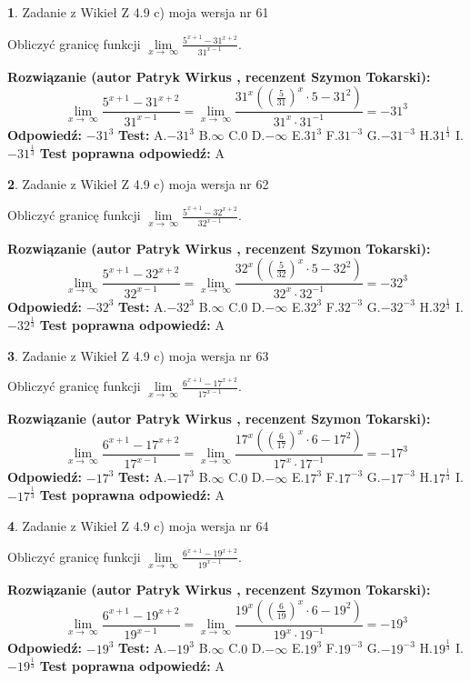 \documentclass[12pt, a4paper]{article}
\theoremstyle{definition} %
\newtheorem{zad}{}
\newcommand{\zadStart}[1]{\begin{zad}#1\newline}
\newcommand{\zadStop}{\end{zad}}
\newcommand{\rozwStart}[2]{\noindent \textbf{Rozwiązanie (autor #1 , recenzent #2): }\newline}
\newcommand{\rozwStop}{\newline}
\newcommand{\odpStart}{\noindent \textbf{Odpowiedź:}\newline}
\newcommand{\odpStop}{\newline}
\newcommand{\testStart}{\noindent \textbf{Test:}\newline}
\newcommand{\testStop}{\newline}
\newcommand{\kluczStart}{\noindent \textbf{Test poprawna odpowiedź:}\newline}
\newcommand{\kluczStop}{\newline}
\begin{document}
\zadStart{Zadanie z Wikieł Z 4.9 c) moja wersja nr 61}


Obliczyć granicę funkcji  $\lim\limits_{x\to\ \infty}\frac{5^{x+1}-31^{x+2}}{31^{x-1}}$.
\zadStop
\rozwStart{Patryk Wirkus}{Szymon Tokarski}
$$\lim\limits_{x\to\ \infty}\frac{5^{x+1}-31^{x+2}}{31^{x-1}}=\lim\limits_{x\to\ \infty}\frac{31^{x}((\frac{5}{31})^{x}\cdot 5 -31^{2})}{31^{x}\cdot 31^{-1}} = -31^{3}$$
\rozwStop
\odpStart
$-31^{3}$
\odpStop
\testStart
A.$-31^{3}$ B.$\infty$ C.$0$ D.$-\infty$ E.$31^{3}$
F.$31^{-3}$ G.$-31^{-3}$
H.$31^{\frac{1}{3}}$
I.$-31^{\frac{1}{3}}$
\testStop
\kluczStart
A
\kluczStop



\zadStart{Zadanie z Wikieł Z 4.9 c) moja wersja nr 62}


Obliczyć granicę funkcji  $\lim\limits_{x\to\ \infty}\frac{5^{x+1}-32^{x+2}}{32^{x-1}}$.
\zadStop
\rozwStart{Patryk Wirkus}{Szymon Tokarski}
$$\lim\limits_{x\to\ \infty}\frac{5^{x+1}-32^{x+2}}{32^{x-1}}=\lim\limits_{x\to\ \infty}\frac{32^{x}((\frac{5}{32})^{x}\cdot 5 -32^{2})}{32^{x}\cdot 32^{-1}} = -32^{3}$$
\rozwStop
\odpStart
$-32^{3}$
\odpStop
\testStart
A.$-32^{3}$ B.$\infty$ C.$0$ D.$-\infty$ E.$32^{3}$
F.$32^{-3}$ G.$-32^{-3}$
H.$32^{\frac{1}{3}}$
I.$-32^{\frac{1}{3}}$
\testStop
\kluczStart
A
\kluczStop



\zadStart{Zadanie z Wikieł Z 4.9 c) moja wersja nr 63}


Obliczyć granicę funkcji  $\lim\limits_{x\to\ \infty}\frac{6^{x+1}-17^{x+2}}{17^{x-1}}$.
\zadStop
\rozwStart{Patryk Wirkus}{Szymon Tokarski}
$$\lim\limits_{x\to\ \infty}\frac{6^{x+1}-17^{x+2}}{17^{x-1}}=\lim\limits_{x\to\ \infty}\frac{17^{x}((\frac{6}{17})^{x}\cdot 6 -17^{2})}{17^{x}\cdot 17^{-1}} = -17^{3}$$
\rozwStop
\odpStart
$-17^{3}$
\odpStop
\testStart
A.$-17^{3}$ B.$\infty$ C.$0$ D.$-\infty$ E.$17^{3}$
F.$17^{-3}$ G.$-17^{-3}$
H.$17^{\frac{1}{3}}$
I.$-17^{\frac{1}{3}}$
\testStop
\kluczStart
A
\kluczStop



\zadStart{Zadanie z Wikieł Z 4.9 c) moja wersja nr 64}


Obliczyć granicę funkcji  $\lim\limits_{x\to\ \infty}\frac{6^{x+1}-19^{x+2}}{19^{x-1}}$.
\zadStop
\rozwStart{Patryk Wirkus}{Szymon Tokarski}
$$\lim\limits_{x\to\ \infty}\frac{6^{x+1}-19^{x+2}}{19^{x-1}}=\lim\limits_{x\to\ \infty}\frac{19^{x}((\frac{6}{19})^{x}\cdot 6 -19^{2})}{19^{x}\cdot 19^{-1}} = -19^{3}$$
\rozwStop
\odpStart
$-19^{3}$
\odpStop
\testStart
A.$-19^{3}$ B.$\infty$ C.$0$ D.$-\infty$ E.$19^{3}$
F.$19^{-3}$ G.$-19^{-3}$
H.$19^{\frac{1}{3}}$
I.$-19^{\frac{1}{3}}$
\testStop
\kluczStart
A
\kluczStop
\end{document}
